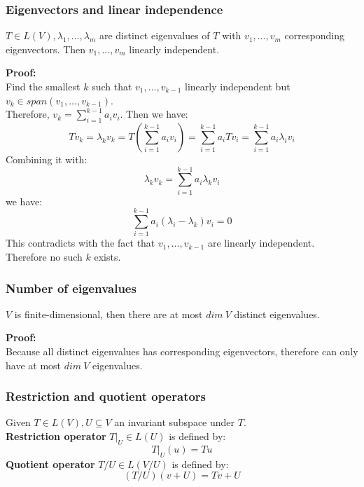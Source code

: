 \documentclass{article}
\begin{document}
\subsubsection{Eigenvectors and linear independence}
\begin{addmargin}[1em]{0em}
$T \in L(V), \lambda_1, ..., \lambda_m$ are distinct eigenvalues of $T$ with $v_1, ..., v_m$ corresponding eigenvectors. Then $v_1, ..., v_m$ linearly independent.
\end{addmargin}
\textbf{Proof:}\\
Find the smallest $k$ such that $v_1, ..., v_{k-1}$ linearly independent but $v_k \in span(v_1, ..., v_{k-1})$.\\
Therefore, $v_k = \sum_{i=1}^{k-1} a_i v_i$. Then we have:
\begin{equation*}
    Tv_k = \lambda_k v_k = T\left(\sum_{i=1}^{k-1} a_i v_i\right) = \sum_{i=1}^{k-1} a_i Tv_i = \sum_{i=1}^{k-1} a_i \lambda_i v_i
\end{equation*}
Combining it with:
\begin{equation*}
    \lambda_k v_k = \sum_{i=1}^{k-1} a_i \lambda_k v_i
\end{equation*}
we have:
\begin{equation*}
    \sum_{i=1}^{k-1} a_i (\lambda_i - \lambda_{k}) v_i = 0
\end{equation*}
This contradicts with the fact that $v_1, ..., v_{k-1}$ are linearly independent.\\
Therefore no such $k$ exists.
\subsubsection{Number of eigenvalues}
\begin{addmargin}[1em]{0em}
$V$ is finite-dimensional, then there are at most $dim\ V$ distinct eigenvalues.
\end{addmargin}
\textbf{Proof:}\\
Because all distinct eigenvalues has corresponding eigenvectors, therefore can only have at most $dim\ V$ eigenvalues.
\subsubsection{Restriction and quotient operators}
\begin{addmargin}[1em]{0em}
Given $T \in L(V), U \subseteq V$ an invariant subspace under $T$.\\
\textbf{Restriction operator} $T|_U \in L(U)$ is defined by:
\begin{equation*}
    T|_U(u) =  Tu
\end{equation*}
\textbf{Quotient operator} $T/U \in L(V/U)$ is defined by:
\begin{equation*}
    (T/U)(v+U) = Tv+U
\end{equation*}
\end{addmargin}
\end{document}
